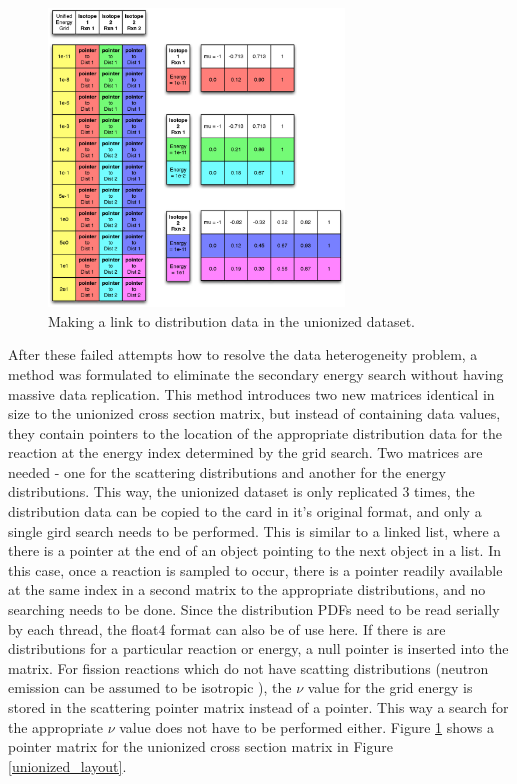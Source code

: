 \begin{figure}[h!] 
\centering
\includegraphics[width=0.7\textwidth]{graphics/unionized_pointers.eps}
\caption{Making a link to distribution data in the unionized dataset. \label{unionized_pointers} }
\end{figure}

After these failed attempts how to resolve the data heterogeneity problem, a method was formulated to eliminate the secondary energy search without having massive data replication.  This method introduces two new matrices identical in size to the unionized cross section matrix, but instead of containing data values, they contain pointers to the location of the appropriate distribution data for the reaction at the energy index determined by the grid search.  Two matrices are needed - one for the scattering distributions and another for the energy distributions.  This way, the unionized dataset is only replicated 3 times, the distribution data can be copied to the card in it's original format, and only a single gird search needs to be performed.  This is similar to a linked list, where a there is a pointer at the end of an object pointing to the next object in a list.  In this case, once a reaction is sampled to occur, there is a pointer readily available at the same index in a second matrix to the appropriate distributions, and no searching needs to be done.  Since the distribution PDFs need to be read serially by each thread, the float4 format can also be of use here.  If there is are distributions for a particular reaction or energy, a null pointer is inserted into the matrix.  For fission reactions which do not have scatting distributions (neutron emission can be assumed to be isotropic \cite{openmc}), the $\nu$ value for the grid energy is stored in the scattering pointer matrix instead of a pointer.  This way a search for the appropriate $\nu$ value does not have to be performed either.  Figure \ref{unionized_pointers} shows a pointer matrix for the unionized cross section matrix in Figure \ref{unionized_layout}.

